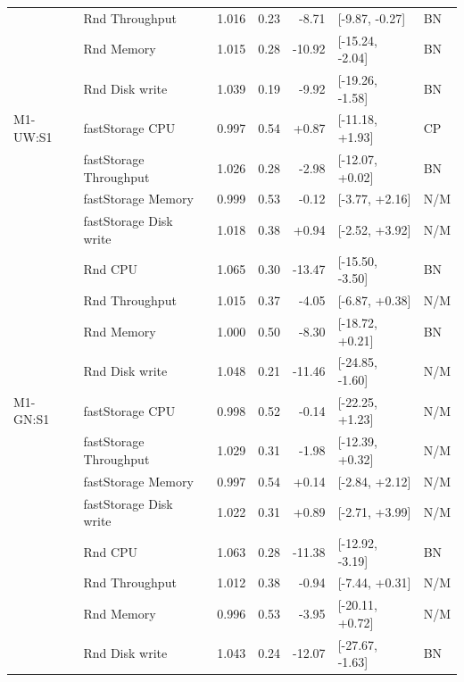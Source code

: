 \documentclass[a4paper,11pt]{article}
\begin{document}
\begin{longtable}{@{}llrrrll@{}}
 & Rnd Throughput & 1.016 & 0.23 & -8.71 & [-9.87, -0.27] & BN \\
 & Rnd Memory & 1.015 & 0.28 & -10.92 & [-15.24, -2.04] & BN \\
 & Rnd Disk write & 1.039 & 0.19 & -9.92 & [-19.26, -1.58] & BN \\
\addlinespace
M1-UW:S1 & fastStorage CPU & 0.997 & 0.54 & +0.87 & [-11.18, +1.93] & CP \\
 & fastStorage Throughput & 1.026 & 0.28 & -2.98 & [-12.07, +0.02] & BN \\
 & fastStorage Memory & 0.999 & 0.53 & -0.12 & [-3.77, +2.16] & N/M \\
 & fastStorage Disk write & 1.018 & 0.38 & +0.94 & [-2.52, +3.92] & N/M \\
 & Rnd CPU & 1.065 & 0.30 & -13.47 & [-15.50, -3.50] & BN \\
 & Rnd Throughput & 1.015 & 0.37 & -4.05 & [-6.87, +0.38] & N/M \\
 & Rnd Memory & 1.000 & 0.50 & -8.30 & [-18.72, +0.21] & BN \\
 & Rnd Disk write & 1.048 & 0.21 & -11.46 & [-24.85, -1.60] & N/M \\
\addlinespace
M1-GN:S1 & fastStorage CPU & 0.998 & 0.52 & -0.14 & [-22.25, +1.23] & N/M \\
 & fastStorage Throughput & 1.029 & 0.31 & -1.98 & [-12.39, +0.32] & N/M \\
 & fastStorage Memory & 0.997 & 0.54 & +0.14 & [-2.84, +2.12] & N/M \\
 & fastStorage Disk write & 1.022 & 0.31 & +0.89 & [-2.71, +3.99] & N/M \\
 & Rnd CPU & 1.063 & 0.28 & -11.38 & [-12.92, -3.19] & BN \\
 & Rnd Throughput & 1.012 & 0.38 & -0.94 & [-7.44, +0.31] & N/M \\
 & Rnd Memory & 0.996 & 0.53 & -3.95 & [-20.11, +0.72] & N/M \\
 & Rnd Disk write & 1.043 & 0.24 & -12.07 & [-27.67, -1.63] & BN \\
\bottomrule
\end{longtable}
\end{document}
